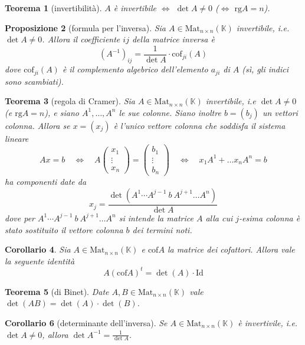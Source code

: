 \documentclass[9pt, a4paper]{article}
\newcommand{\K}{\mathbb{K}}
\newcommand{\rg}{\mathrm{rg}}
\newcommand{\cof}{\mathrm{cof}}
\newcommand{\Id}{\mathrm{Id}}
\theoremstyle{mythm}
\newtheorem{thm}{Teorema}[section]
\newtheorem{corollary}[thm]{Corollario}
\newtheorem{prop}[thm]{Proposizione}
\begin{document}
\begin{thm}[invertibilità]
	$ A $ è invertibile $ \iff $ $ \det{A} \neq 0 $ ($ \iff $ $ \rg A = n $).
\end{thm}

\begin{prop}[formula per l'inversa]
Sia $ A \in \mathrm{Mat}_{n \times n} (\K) $ invertibile, i.e. $ \det A \neq 0 $. Allora il coefficiente $ ij $ della matrice inversa è \[\left(A^{-1}\right)_{ij} = \frac{1}{\det{A}} \cdot \cof_{ji}{(A)}\] dove $ \cof_{ji}{(A)} $ è il complemento algebrico dell'elemento $ a_{ji} $ di $ A $ (sì, gli indici sono scambiati).   
\end{prop}

\begin{thm}[regola di Cramer]
	Sia $ A \in \mathrm{Mat}_{n \times n} (\K) $ invertibile, i.e $ \det A \neq 0 $ (e $ \rg A = n $), e siano $ A^{1}, \ldots, A^{n} $ le sue colonne. Siano inoltre $ b = (b_j) $ un vettori colonna. Allora se $ x = (x_j) $ è l'unico vettore colonna che soddisfa il sistema lineare 
	\[Ax = b \quad \iff \quad A \begin{pmatrix} x_1 \\ \vdots \\ x_n \end{pmatrix} = \begin{pmatrix} b_1 \\ \vdots \\ b_n \end{pmatrix} \quad \iff \quad x_1 A^{1} + \ldots x_n A^{n} = b\]
	ha componenti date da 
	\[x_j = \frac{\det{\left(A^{1} \cdots A^{j - 1} \ b \ A^{j + 1} \ldots A^{n}\right)}}{\det{A}}\]
	dove per $ A^{1} \cdots A^{j - 1} \ b \ A^{j + 1} \ldots A^{n} $ si intende la matrice $ A $ alla cui $ j $-esima colonna è stato sostituito il vettore colonna $ b $ dei termini noti.  
\end{thm}

\begin{corollary}
	Sia $ A \in \mathrm{Mat}_{n \times n} (\K) $ e $ \cof{A} $ la matrice dei cofattori. Allora vale la seguente identità \[A (\cof{A})^{t} = \det{(A)} \cdot \Id\]
\end{corollary}

\begin{thm}[di Binet]
	Date $ A, B \in \mathrm{Mat}_{n \times n} (\K) $ vale $ \det{(AB)} = \det{(A)} \cdot \det{(B)} $. 
\end{thm}

\begin{corollary}[determinante dell'inversa]
	Se $ A \in \mathrm{Mat}_{n \times n} (\K) $ è invertivile, i.e. $ \det{A} \neq 0 $, allora $ \det{A^{-1}} = \frac{1}{\det{A}} $. 
\end{corollary}
\end{document}
